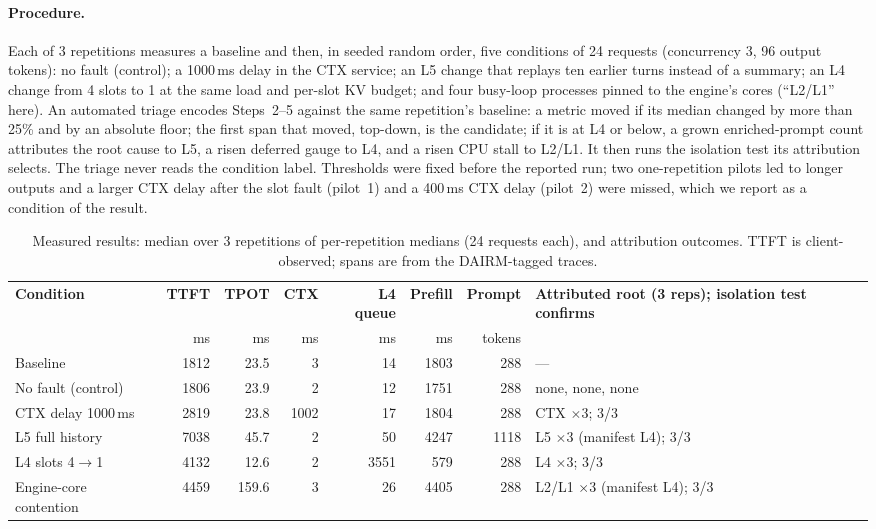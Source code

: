 \documentclass[11pt]{article}
\begin{document}
\paragraph{Procedure.} Each of 3 repetitions measures a baseline and then, in seeded random order, five conditions of 24 requests (concurrency 3, 96 output tokens): no fault (control); a 1000\,ms delay in the CTX service; an L5 change that replays ten earlier turns instead of a summary; an L4 change from 4 slots to 1 at the same load and per-slot KV budget; and four busy-loop processes pinned to the engine's cores (``L2/L1'' here). An automated triage encodes Steps~2--5 against the same repetition's baseline: a metric moved if its median changed by more than 25\% and by an absolute floor; the first span that moved, top-down, is the candidate; if it is at L4 or below, a grown enriched-prompt count attributes the root cause to L5, a risen deferred gauge to L4, and a risen CPU stall to L2/L1. It then runs the isolation test its attribution selects. The triage never reads the condition label. Thresholds were fixed before the reported run; two one-repetition pilots led to longer outputs and a larger CTX delay after the slot fault (pilot~1) and a 400\,ms CTX delay (pilot~2) were missed, which we report as a condition of the result.

\begin{table}[!htbp]
\centering
\caption{Measured results: median over 3 repetitions of per-repetition medians (24 requests each), and attribution outcomes. TTFT is client-observed; spans are from the DAIRM-tagged traces.}
\label{tab:study}
\footnotesize
\begin{tabularx}{\textwidth}{@{}>{\raggedright\arraybackslash}p{2.6cm}rrrrrrY@{}}
\toprule
\textbf{Condition} & \textbf{TTFT} & \textbf{TPOT} & \textbf{CTX} & \textbf{L4 queue} & \textbf{Prefill} & \textbf{Prompt} & \textbf{Attributed root (3 reps); isolation test confirms}\\
 & ms & ms & ms & ms & ms & tokens & \\
\midrule
Baseline & 1812 & 23.5 & 3 & 14 & 1803 & 288 & ---\\
No fault (control) & 1806 & 23.9 & 2 & 12 & 1751 & 288 & none, none, none\\
CTX delay 1000\,ms & 2819 & 23.8 & 1002 & 17 & 1804 & 288 & CTX $\times$3; 3/3\\
L5 full history & 7038 & 45.7 & 2 & 50 & 4247 & 1118 & L5 $\times$3 (manifest L4); 3/3\\
L4 slots 4$\rightarrow$1 & 4132 & 12.6 & 2 & 3551 & 579 & 288 & L4 $\times$3; 3/3\\
Engine-core contention & 4459 & 159.6 & 3 & 26 & 4405 & 288 & L2/L1 $\times$3 (manifest L4); 3/3\\
\bottomrule
\end{tabularx}
\end{table}
\end{document}
